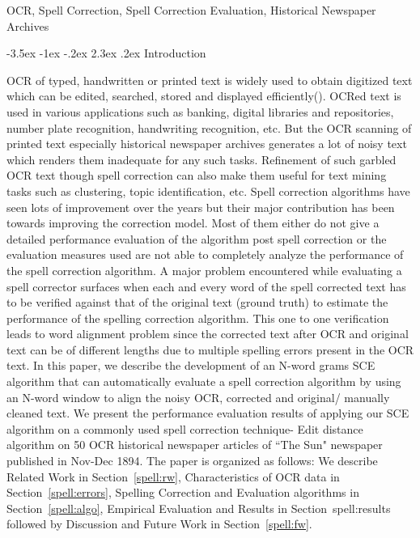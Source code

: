 \documentclass[12pt]{article}
\makeatletter
\renewcommand\section{\@startsection{section}{1}{\z@}%
                                  {-3.5ex \@plus -1ex \@minus -.2ex}%
                                  {2.3ex \@plus.2ex}%
                                  {\normalfont\bfseries}}
\makeatother
\begin{document}
 OCR, Spell Correction, Spell Correction Evaluation, Historical Newspaper Archives



\section{Introduction}

OCR of typed, handwritten or printed text is widely used to obtain digitized text which can be edited, searched, stored and displayed efficiently(\cite{torget2011mapping,palfray2012logical}). OCRed text is used in various applications such as banking, digital libraries \cite{mcmurdo2013vermont} and repositories, number plate recognition, handwriting recognition, etc\cite{singh2012survey}. But the OCR scanning of printed text especially historical newspaper archives generates a lot of noisy text which renders them inadequate for any such tasks. Refinement of such garbled OCR text though spell correction can also make them useful for text mining tasks such as clustering\cite{dutta2011learning}, topic identification\cite{yang2011topic,lee2010topic}, etc.
Spell correction algorithms have seen lots of improvement over the years but their major contribution has been towards improving the correction model. Most of them either do not give a detailed performance evaluation of the algorithm post spell correction or the evaluation measures used are not able to completely analyze the performance of the spell correction algorithm.  
A major problem encountered while evaluating a spell corrector surfaces when each and every word of the spell corrected text has to be verified against that of the original text (ground truth) to estimate the performance of the spelling correction algorithm. This one to one verification leads to word alignment problem since the corrected text after OCR and original text can be of different lengths due to multiple spelling errors present in the OCR text.
In this paper, we describe the development of  an N-word grams SCE algorithm that can automatically evaluate a spell correction algorithm by using an N-word window to align the noisy OCR, corrected and original/ manually cleaned text. We present the performance evaluation results of applying our SCE algorithm on a  commonly used spell correction technique- Edit distance algorithm on 50 OCR historical newspaper articles of ``The Sun" newspaper published in Nov-Dec 1894. 
The paper is organized as follows: We describe Related Work in Section~\ref{spell:rw}, Characteristics of OCR data in Section~\ref{spell:errors}, Spelling Correction and Evaluation algorithms in Section~\ref{spell:algo}, Empirical Evaluation and Results in Section~{spell:results} followed by Discussion and Future Work in Section~\ref{spell:fw}. 
\end{document}
